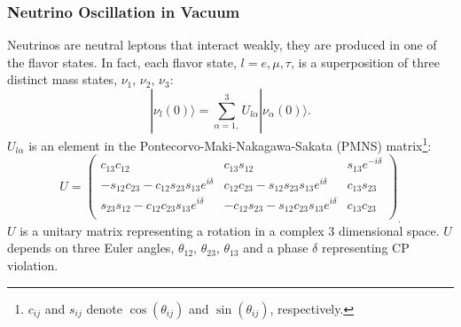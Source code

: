 \documentclass[10pt,professionalfonts,xcolor=table]{beamer}
\begin{document}
\frame
{
  \frametitle{Neutrino Oscillation in Vacuum}
  \begin{itemize}
  \bang Neutrinos are neutral leptons that interact weakly, they are produced in one of the flavor states.
  \bang In fact, each flavor state, $l=e,\mu,\tau$,  is a superposition of three distinct mass states, $\nu_1$, $\nu_2$, $\nu_3$:
  \begin{equation*}
|\nu_l(0) \rangle = \sum_{\alpha = 1,}^3 U_{l\alpha}|\nu_\alpha(0) \rangle.
  \end{equation*}
  \bang $U_{l\alpha}$ is an element in the Pontecorvo-Maki-Nakagawa-Sakata (PMNS) matrix\footnote{$c_{ij}$ and $s_{ij}$ denote $\cos(\theta_{ij})$ and $\sin(\theta_{ij})$, respectively. \vspace{3pt}}: 
  \begin{equation*}
 U = \begin{pmatrix} \label{pmns} 
c_{13}c_{12}              &    c_{13}s_{12} 	   	 & 		s_{13} e^{-i\delta} \\
-s_{12}c_{23} - c_{12}s_{23}s_{13}e^{i\delta}	& c_{12}c_{23} - s_{12}s_{23}s_{13}e^{i\delta} 				& 		c_{13}s_{23}  \\
s_{23}s_{12} - c_{12}c_{23}s_{13}e^{i\delta}	& -c_{12}s_{23} - s_{12}c_{23}s_{13}e^{i\delta} 				& 		c_{13}c_{23}  \\
\end{pmatrix}_{.}
\end{equation*}
\bang $U$ is a unitary matrix representing a rotation in a complex 3 dimensional space.
\bang $U$ depends on three Euler angles, $\theta_{12}$, $\theta_{23}$, $\theta_{13}$ and a phase $\delta$ representing CP violation.
  \end{itemize}
}
\end{document}
